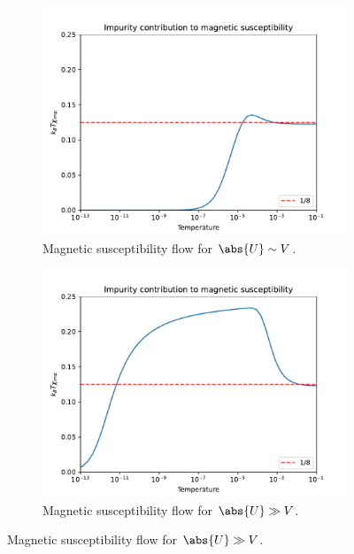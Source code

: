 \begin{figure}
  \centering
  \begin{subfigure}[b]{0.4\linewidth}
    \centering
    \includegraphics[width=\linewidth]{./gfx/results/tchi_lowU.pdf}
    \caption{Magnetic susceptibility flow for $\abs{U} \sim V$.}
    \label{fig:5-results-tchi-lowu}
  \end{subfigure}
  \begin{subfigure}[b]{0.4\linewidth}
    \centering
    \includegraphics[width=\linewidth]{./gfx/results/tchi.pdf}
    \caption{Magnetic susceptibility flow for $\abs{U} \gg V$.}
    \label{fig:5-results-tchi}
  \end{subfigure}
\end{figure}

